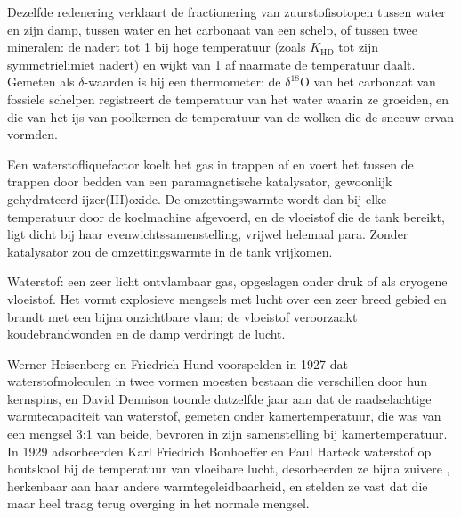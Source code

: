 Dezelfde redenering verklaart de fractionering van zuurstofisotopen tussen
water en zijn damp, tussen water en het carbonaat van een schelp, of
tussen twee mineralen: de  nadert tot 1 bij hoge
temperatuur (zoals $K_{\mathrm{HD}}$ tot zijn symmetrielimiet nadert) en
wijkt van 1 af naarmate de temperatuur daalt. Gemeten als
$\delta$-waarden is hij een thermometer: de $\delta^{18}$O van het
carbonaat van fossiele schelpen registreert de temperatuur van het water
waarin ze groeiden, en die van het ijs van poolkernen de temperatuur van
de wolken die de sneeuw ervan vormden.

\begin{inthelab}
Een waterstofliquefactor koelt het gas in trappen af en voert het tussen
de trappen door bedden van een paramagnetische katalysator, gewoonlijk
gehydrateerd ijzer(III)oxide. De omzettingswarmte wordt dan bij elke
temperatuur door de koelmachine afgevoerd, en de vloeistof die de tank
bereikt, ligt dicht bij haar evenwichtssamenstelling, vrijwel helemaal
para. Zonder katalysator zou de omzettingswarmte in de tank vrijkomen.
\end{inthelab}

\begin{safety}{}
Waterstof: een zeer licht ontvlambaar gas, opgeslagen onder druk of als
cryogene vloeistof. Het vormt explosieve mengsels met lucht over een zeer
breed gebied en brandt met een bijna onzichtbare vlam; de vloeistof
veroorzaakt koudebrandwonden en de damp verdringt de lucht.
\end{safety}

\begin{history}
Werner Heisenberg en Friedrich Hund voorspelden in 1927 dat
waterstofmoleculen in twee vormen moesten bestaan die verschillen door hun
kernspins, en David Dennison toonde datzelfde jaar aan dat de raadselachtige
warmtecapaciteit van waterstof, gemeten onder kamertemperatuur, die was
van een mengsel 3:1 van beide, bevroren in zijn samenstelling bij
kamertemperatuur. In 1929 adsorbeerden Karl Friedrich Bonhoeffer en Paul
Harteck waterstof op houtskool bij de temperatuur van vloeibare lucht,
desorbeerden ze bijna zuivere , herkenbaar aan haar andere
warmtegeleidbaarheid, en stelden ze vast dat die maar heel traag terug
overging in het normale mengsel.
\end{history}

